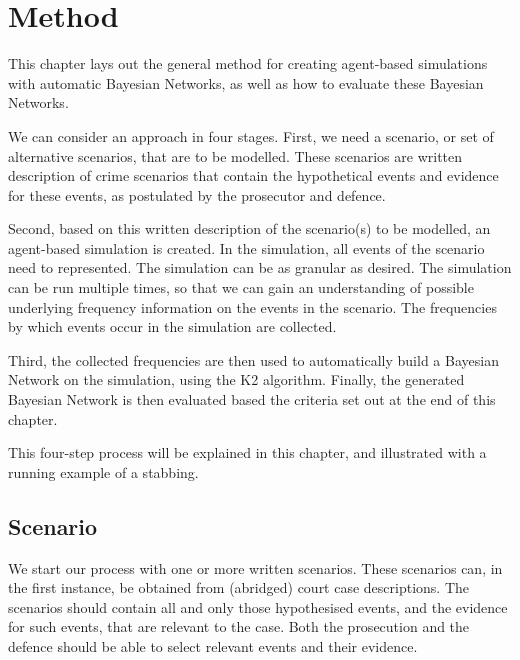  

\chapter[Method]{Method}



This chapter lays out the general method for creating agent-based simulations with automatic Bayesian Networks, as well as how to evaluate these Bayesian Networks.

We can consider an approach in four stages. First, we need a scenario, or set of alternative scenarios, that are to be modelled. These scenarios are written description of crime scenarios that contain the hypothetical events and evidence for these events, as postulated by the prosecutor and defence. 

Second, based on this written description of the scenario(s) to be modelled, an agent-based simulation is created. In the simulation, all events of the scenario need to represented. The simulation can be as granular as desired. The simulation can be run multiple times, so that we can gain an understanding of possible underlying frequency information on the events in the scenario. The frequencies by which events occur in the simulation are collected.

Third, the collected frequencies are then used to automatically build a Bayesian Network on the simulation, using the K2 algorithm. Finally, the generated Bayesian Network is then evaluated based the criteria set out at the end of this chapter.

This four-step process will be explained in this chapter, and illustrated with a running example of a stabbing.



\section{Scenario}
We start our process with one or more written scenarios. These scenarios can, in the first instance, be obtained from (abridged) court case descriptions. The scenarios should contain all and only those hypothesised events, and the evidence for such events, that are relevant to the case. Both the prosecution and the defence should be able to select relevant events and their evidence. 


